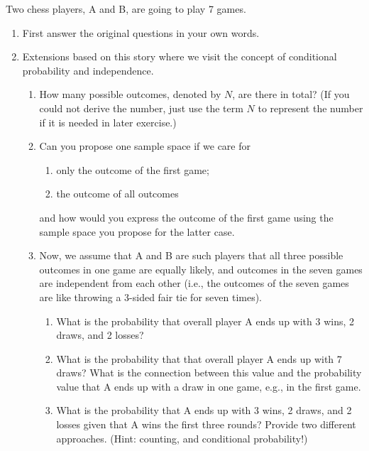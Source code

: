 
\setcounter{theorem}{6}
\begin{exercise}[BH.1.7]
	Two chess players, A and B, are going to play 7 games. 
		\begin{enumerate}
		\item First answer the original questions in your own words.
		\item Extensions based on this story where we visit the concept of conditional probability and independence.
		\begin{enumerate}
					\item How many possible outcomes, denoted by $N$, are there in total? (If you could not derive the number, just use the term $N$ to represent the number if it is needed in later exercise.)
			\item Can you propose one sample space if we care for 
			\begin{enumerate}
				\item only the outcome of the first game;
				\item the outcome of all outcomes
			\end{enumerate}
			and how would you express the outcome of the first game using the sample space you propose for the latter case.
			\item Now, we assume that A and B are such players that all three possible outcomes in one game are equally likely, and outcomes in the seven games are independent from each other (i.e., the outcomes of the seven games are like throwing a 3-sided fair tie for seven times). 
			\begin{enumerate}
				\item What is the probability that overall player A ends up with 3 wins, 2 draws, and 2 losses?
				\item What is the probability that that overall player A ends up with 7 draws? What is the connection between this value and the probability value that A ends up with a draw in one game, e.g., in the first game.
				\item What is the probability that A ends up with 3 wins, 2 draws, and 2 losses given that A wins the first three rounds? Provide two different approaches. (Hint: counting, and conditional probability!) 
			\end{enumerate}
		\end{enumerate}
		\end{enumerate}
\end{exercise}

